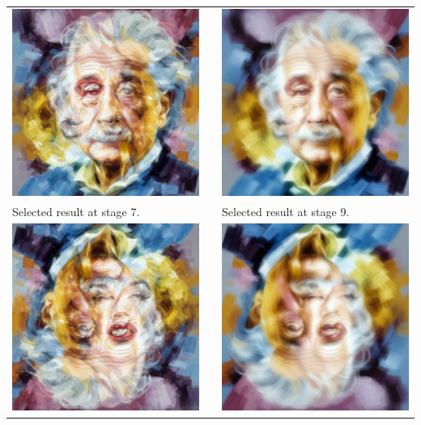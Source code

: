 \documentclass[12pt,letterpaper]{article}
\begin{document}
    \noindent\begin{tabular}{ >{\centering}m{2.9in} m{0.18in} >{\centering\arraybackslash}m{2.9in} }
        \includegraphics[width=2.8in]{img_einstein_monroe_7.png} & & \includegraphics[width=2.8in]{img_einstein_monroe_9.png} \\
        Selected result at stage 7. & & Selected result at stage 9. \\
        \includegraphics[width=2.8in]{img_einstein_monroe_7_rotated.png} & & \includegraphics[width=2.8in]{img_einstein_monroe_9_rotated.png} \\

\end{tabular}
\end{document}
